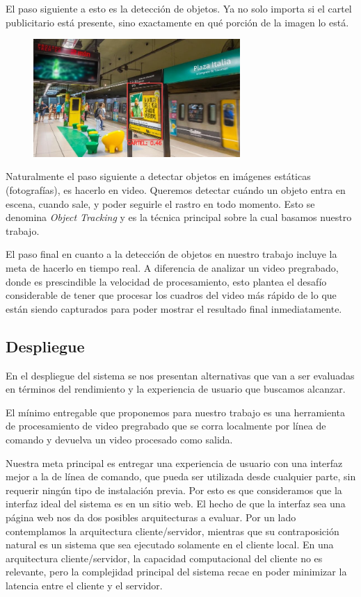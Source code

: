 \documentclass[a4paper]{article}
\begin{document}
El paso siguiente a esto es la detección de objetos. Ya no solo importa si el cartel publicitario está presente, sino exactamente en qué porción de la imagen lo está.

\begin{figure}[H]
    \includegraphics[width=0.7\textwidth]{./img/detection.jpg}
    \centering
\end{figure}

Naturalmente el paso siguiente a detectar objetos en imágenes estáticas (fotografías), es hacerlo en video. Queremos detectar cuándo un objeto entra en escena, cuando sale, y poder seguirle el rastro en todo momento. Esto se denomina \emph{Object Tracking} y es la técnica principal sobre la cual basamos nuestro trabajo.

El paso final en cuanto a la detección de objetos en nuestro trabajo incluye la meta de hacerlo en tiempo real. A diferencia de analizar un video pregrabado, donde es prescindible la velocidad de procesamiento, esto plantea el desafío considerable de tener que procesar los cuadros del video más rápido de lo que están siendo capturados para poder mostrar el resultado final inmediatamente.

\subsection{Despliegue}
En el despliegue del sistema se nos presentan alternativas que van a ser evaluadas en términos del rendimiento y la experiencia de usuario que buscamos alcanzar.

El mínimo entregable que proponemos para nuestro trabajo es una herramienta de procesamiento de video pregrabado que se corra localmente por línea de comando y devuelva un video procesado como salida.

Nuestra meta principal es entregar una experiencia de usuario con una interfaz mejor a la de línea de comando, que pueda ser utilizada desde cualquier parte, sin requerir ningún tipo de instalación previa. Por esto es que consideramos que la interfaz ideal del sistema es en un sitio web.
El hecho de que la interfaz sea una página web nos da dos posibles arquitecturas a evaluar. Por un lado contemplamos la arquitectura cliente/servidor, mientras que su contraposición natural es un sistema que sea ejecutado solamente en el cliente local.
En una arquitectura cliente/servidor, la capacidad computacional del cliente no es relevante, pero la complejidad principal del sistema recae en poder minimizar la latencia entre el cliente y el servidor.
\end{document}
